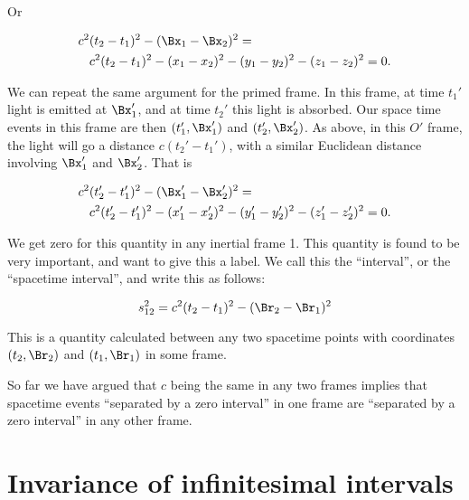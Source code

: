 Or

\begin{equation}\label{eqn:relativisticElectrodynamicsL2:30}
\begin{aligned}
c^2 &(t_2 - t_1)^2 - (\Bx_1 - \Bx_2)^2 = \\
&c^2 (t_2 - t_1)^2 
- (x_1 - x_2)^2
- (y_1 - y_2)^2
- (z_1 - z_2)^2 = 0.
\end{aligned}
\end{equation}

We can repeat the same argument for the primed frame.  In this frame, at time \(t_1'\) light is emitted at \(\Bx_1'\), and at time \(t_2'\) this light is absorbed.  Our space time events in this frame are then \((t_1', \Bx_1')\) and \((t_2', \Bx_2')\).  As above, in this \(O'\) frame, the light will go a distance \(c(t_2' - t_1')\), with a similar Euclidean distance involving \(\Bx_1'\) and \(\Bx_2'\).  That is

\begin{equation}\label{eqn:relativisticElectrodynamicsL2:40}
\begin{aligned}
c^2 &(t_2' - t_1')^2 - (\Bx_1' - \Bx_2')^2 = \\
&c^2 (t_2' - t_1')^2 
- (x_1' - x_2')^2
- (y_1' - y_2')^2
- (z_1' - z_2')^2 = 0.
\end{aligned}
\end{equation}

We get zero for this quantity in any inertial frame 1.  This quantity is found to be very important, and want to give this a label.  We call this the ``interval'', or the ``spacetime interval'', and write this as follows:

\begin{equation}\label{eqn:relativisticElectrodynamicsL2:50}
s_{12}^2 = c^2 (t_2 - t_1)^2 - (\Br_2 - \Br_1)^2
\end{equation}

This is a quantity calculated between any two spacetime points with coordinates \((t_2, \Br_2)\) and \((t_1, \Br_1)\) in some frame.

So far we have argued that \(c\) being the same in any two frames implies that spacetime events ``separated by a zero interval'' in one frame are ``separated by a zero interval'' in any other frame.

\section{Invariance of infinitesimal intervals}

